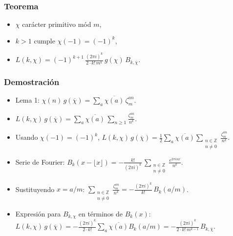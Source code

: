 \documentclass[handout]{beamer}
\begin{document}
\begin{frame}
  \frametitle{Teorema}

  \begin{itemize}
  \item<1-> $\chi$ carácter primitivo mód $m$,

  \item<2-> $k > 1$ cumple $\chi (-1) = (-1)^k$,

  \item<3-> $L (k,\chi) = (-1)^{k+1} \, \frac{(2\pi i)^k}{2\cdot k! \, m^k}\,g (\chi)\,B_{k,\overline{\chi}}$.
  \end{itemize}
\end{frame}


\begin{frame}
  \frametitle{Demostración}

  \begin{itemize}
  \item<1-> Lema 1: $\chi (n)\,g (\overline{\chi}) = \sum_a \overline{\chi (a)}\,\zeta^{an}_m$.

  \item<2-> $L (k,\chi)\,g (\overline{\chi}) = \sum_a \overline{\chi (a)} \, \sum_{n\ge 1} \frac{\zeta_m^{an}}{n^k}$.

  \item<3-> Usando $\chi (-1) = (-1)^k$,
    $L (k,\chi)\,g (\overline{\chi}) = \frac{1}{2} \sum_a \overline{\chi (a)} \sum_{\substack{n \in \mathbb{Z} \\ n \ne 0}} \frac{\zeta_m^{an}}{n^k}$.

  \item<4-> Serie de Fourier: $B_k (x - \lfloor x\rfloor) = -\frac{k!}{(2\pi i)^k} \, \sum_{\substack{n \in \mathbb{Z} \\ n \ne 0}} \frac{e^{2\pi i n x}}{n^k}$.

  \item<5-> Sustituyendo $x = a/m$:
    $\sum_{\substack{n \in \mathbb{Z} \\ n \ne 0}} \frac{\zeta_m^{an}}{n^k} = -\frac{(2\pi i)^k}{k!}\,B_k (a/m)$.

  \item<6-> Expresión para $B_{k,\chi}$ en términos de $B_k (x)$:
    $L (k,\chi)\,g (\overline{\chi}) = -\frac{(2\pi i)^k}{2\cdot k!} \sum_a \overline{\chi (a)} B_k (a/m) = -\frac{(2\pi i)^k}{2\cdot k!\,m^{k-1}}\,B_{k,\overline{\chi}}$.
  \end{itemize}
\end{frame}
\end{document}

